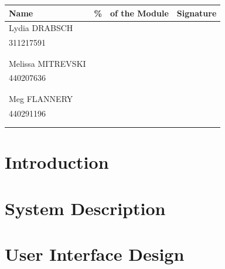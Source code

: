 \documentclass[11pt,a4paper]{article}
\renewcommand{\thepage}{\roman{page}}
\renewcommand{\thepage}{\roman{page}}
\begin{document}
\begin{table}[h]
\centering
\begin{tabular}{|p{4cm}|p{0.75cm}|p{5cm}|p{4cm}|}
\hline Name & \% & of the Module & Signature\\
\hline Lydia DRABSCH & & &  \\
\cline{2-3} 311217591 & & & \\
\cline{2-3} & & & \\
\cline{2-3} & & & \\
\hline Melissa MITREVSKI& & & \\
\cline{2-3} 440207636 & & & \\
\cline{2-3} & & & \\
\cline{2-3} & & & \\
\hline Meg FLANNERY & & & \\
\cline{2-3} 440291196 & & & \\
\cline{2-3} & & & \\
\cline{2-3} & & & \\
\hline
\end{tabular}
\end{table}
\newpage

\tableofcontents
\listoffigures
\listoftables
\newpage
{}


\section{Introduction}



\section{System Description}











\section{User Interface Design}
\end{document}
